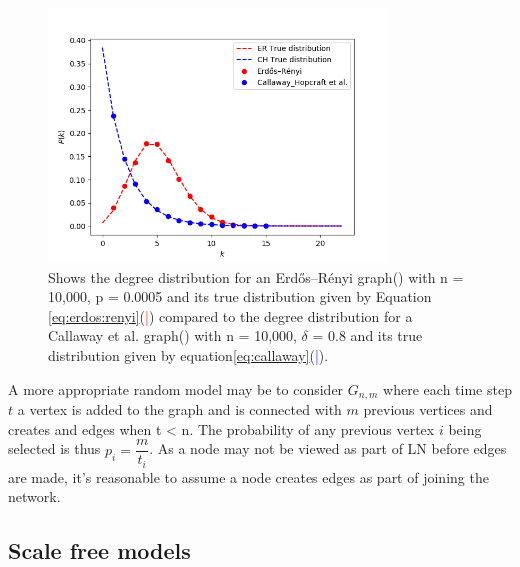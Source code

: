 \begin{figure}[!htb]
		\hspace*{-0.5cm} 
	\centering
	\includegraphics[width=9cm]{images/random_topology_degree_distribution.png}
	\caption{Shows the degree distribution for an Erdős–Rényi graph(\tikzcircle[red, fill=red]{2pt}) with n = 10,000, p = 0.0005 and its true distribution given by Equation \ref{eq:erdos:renyi}(\textcolor{red}{|}) compared to the degree distribution for a Callaway et al. graph(\tikzcircle[blue, fill=blue]{2pt})  with n = 10,000, $\delta$ = 0.8 and its true distribution given by equation\ref{eq:callaway}(\textcolor{blue}{|}).
	}
	\label{fig:fee_curve}
		\hspace*{2mm} 
\end{figure}

A more appropriate random model may be to consider $G_{n,m}$ where each time step $t$ a vertex is added to the graph and is connected with $m$ previous vertices and creates and edges when t < n. The probability of any previous vertex $i$ being selected is thus $p_i = \dfrac{m}{t_i}$. 
As a node may not be viewed as part of LN before edges are made, it's reasonable to assume a node creates edges as part of joining the network.




\subsection{Scale free models}

